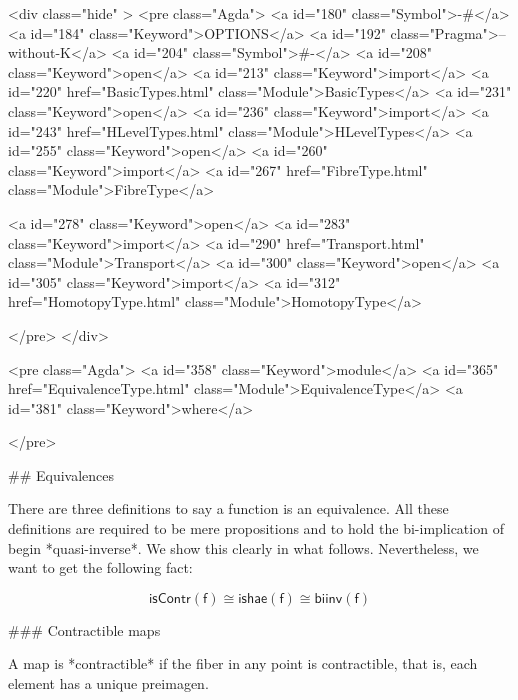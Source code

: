   <div class="hide" >
<pre class="Agda">
<a id="180" class="Symbol">{-#</a> <a id="184" class="Keyword">OPTIONS</a> <a id="192" class="Pragma">--without-K</a> <a id="204" class="Symbol">#-}</a>
<a id="208" class="Keyword">open</a> <a id="213" class="Keyword">import</a> <a id="220" href="BasicTypes.html" class="Module">BasicTypes</a>
<a id="231" class="Keyword">open</a> <a id="236" class="Keyword">import</a> <a id="243" href="HLevelTypes.html" class="Module">HLevelTypes</a>
<a id="255" class="Keyword">open</a> <a id="260" class="Keyword">import</a> <a id="267" href="FibreType.html" class="Module">FibreType</a>

<a id="278" class="Keyword">open</a> <a id="283" class="Keyword">import</a> <a id="290" href="Transport.html" class="Module">Transport</a>
<a id="300" class="Keyword">open</a> <a id="305" class="Keyword">import</a> <a id="312" href="HomotopyType.html" class="Module">HomotopyType</a>

</pre>
</div>

<pre class="Agda">
<a id="358" class="Keyword">module</a> <a id="365" href="EquivalenceType.html" class="Module">EquivalenceType</a> <a id="381" class="Keyword">where</a>

</pre>

## Equivalences

There are three definitions to say a function is an
equivalence. All these definitions
are required to be mere propositions and to hold
the bi-implication of begin *quasi-inverse*. We show
this clearly in what follows. Nevertheless, we want to get
the following fact:

$$\mathsf{isContr(f)} \cong \mathsf{ishae(f)} \cong \mathsf{biinv(f)} $$

### Contractible maps

A map is *contractible* if the fiber in any point is contractible, that is, each
element has a unique preimagen.

